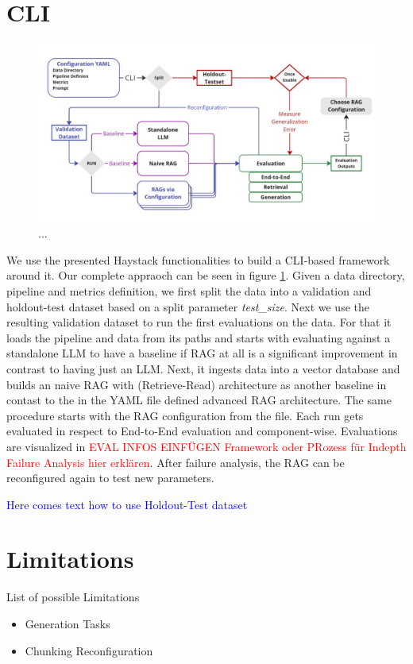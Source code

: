\section{CLI}

\begin{figure}[!ht]
    \centering
    \includegraphics[width=\textwidth]{images/Sketch.pdf}
    \caption{...}
    \label{fig:EvaluationDesign}
\end{figure}

We use the presented Haystack functionalities to build a CLI-based framework around it. Our complete appraoch can be seen in figure \ref{fig:EvaluationDesign}. Given a data directory, pipeline and metrics definition, we first split the data into a validation and holdout-test dataset based on a split parameter \textit{test\_size}. Next we use the resulting validation dataset to run the first evaluations on the data. For that it loads the pipeline and data from its paths and starts with evaluating against a standalone LLM to have a baseline if RAG at all is a significant improvement in contrast to having just an LLM. Next, it ingests data into a vector database and builds an naive RAG with (Retrieve-Read) architecture as another baseline in contast to the in the YAML file defined advanced RAG architecture. The same procedure starts with the RAG configuration from the file. Each run gets evaluated in respect to End-to-End evaluation and component-wise. Evaluations are visualized in \textcolor{red}{EVAL INFOS EINFÜGEN Framework oder PRozess für Indepth Failure Analysis hier erklären}. After failure analysis, the RAG can be reconfigured again to test new parameters. 

\textcolor{blue}{Here comes text how to use Holdout-Test dataset}



\section{Limitations}

List of possible Limitations

\begin{itemize}
    \item Generation Tasks 
    \item Chunking Reconfiguration
\end{itemize}